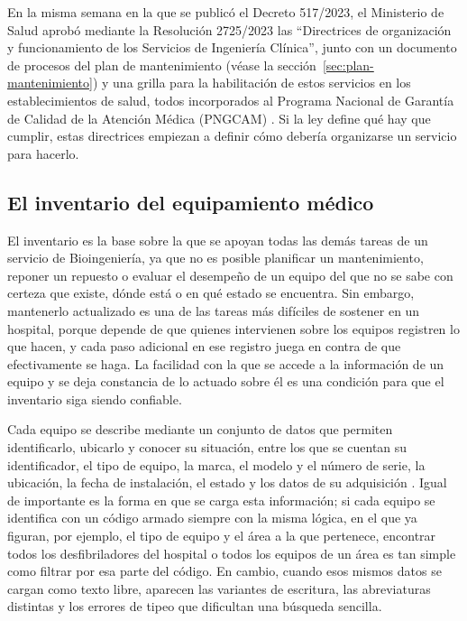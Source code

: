 \documentclass[10pt]{article}
\begin{document}
En la misma semana en la que se publicó el Decreto 517/2023, el Ministerio de Salud aprobó mediante la Resolución 2725/2023 las “Directrices de organización y funcionamiento de los Servicios de Ingeniería Clínica”, junto con un documento de procesos del plan de mantenimiento (véase la sección~\ref{sec:plan-mantenimiento}) y una grilla para la habilitación de estos servicios en los establecimientos de salud, todos incorporados al Programa Nacional de Garantía de Calidad de la Atención Médica (PNGCAM) \cite{res_2725_2023}. Si la ley define qué hay que cumplir, estas directrices empiezan a definir cómo debería organizarse un servicio para hacerlo.

\subsection{El inventario del equipamiento médico}
\label{sec:inventario}

El inventario es la base sobre la que se apoyan todas las demás tareas de un servicio de Bioingeniería, ya que no es posible planificar un mantenimiento, reponer un repuesto o evaluar el desempeño de un equipo del que no se sabe con certeza que existe, dónde está o en qué estado se encuentra. Sin embargo, mantenerlo actualizado es una de las tareas más difíciles de sostener en un hospital, porque depende de que quienes intervienen sobre los equipos registren lo que hacen, y cada paso adicional en ese registro juega en contra de que efectivamente se haga. La facilidad con la que se accede a la información de un equipo y se deja constancia de lo actuado sobre él es una condición para que el inventario siga siendo confiable.

Cada equipo se describe mediante un conjunto de datos que permiten identificarlo, ubicarlo y conocer su situación, entre los que se cuentan su identificador, el tipo de equipo, la marca, el modelo y el número de serie, la ubicación, la fecha de instalación, el estado y los datos de su adquisición \cite{oms_inventarios_2012}. Igual de importante es la forma en que se carga esta información; si cada equipo se identifica con un código armado siempre con la misma lógica, en el que ya figuran, por ejemplo, el tipo de equipo y el área a la que pertenece, encontrar todos los desfibriladores del hospital o todos los equipos de un área es tan simple como filtrar por esa parte del código. En cambio, cuando esos mismos datos se cargan como texto libre, aparecen las variantes de escritura, las abreviaturas distintas y los errores de tipeo que dificultan una búsqueda sencilla.
\end{document}

